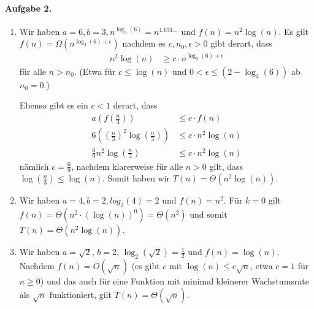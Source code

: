 \documentclass{article}
\begin{document}
\paragraph{Aufgabe 2.}

\begin{enumerate}
    \item Wir haben $a = 6, b = 3, n^{\log_{3}(6)} = n^{1.631\ldots}$ und $f(n) = n^2 \log(n)$. Es gilt $f(n) = \Omega(n^{\log_{3}(6) + \epsilon})$ nachdem es $c, n_0, \epsilon > 0$ gibt derart, dass
    \begin{align*}
        n^2 \log(n) &\geq c \cdot n^{\log_{3}(6) + \epsilon}
    \end{align*}
    für alle $n > n_0$. (Etwa f\"ur $c \leq \log(n)$ und $0 < \epsilon \leq (2 - \log_{3}(6))$ ab $n_0 = 0$.)
 
    Ebenso gibt es ein $c < 1$ derart, dass
    \begin{align*}
        a\left(f\left(\frac{n}{3}\right)\right) &\leq c \cdot f(n) \\
        6\left(\left(\frac{n}{3}\right)^2 \log(\frac{n}{3})\right) &\leq c \cdot n^2 \log(n) \\
        \frac{6}{9}n^2 \log(\frac{n}{3}) &\leq c \cdot n^2 \log(n)
    \end{align*}
    nämlich $c = \frac{6}{9}$, nachdem klarerweise für alle $n > 0$ gilt, dass $\log(\frac{n}{3}) \leq \log(n)$. Somit haben wir $T(n) = \Theta(n^2 \log(n))$.

    \item Wir haben $a = 4, b = 2, log_2(4) = 2$ und $f(n) = n^2$. F\"ur $k = 0$ gilt $f(n) = \Theta(n^2 \cdot (\log(n))^0) = \Theta(n^2)$ und somit $T(n) = \Theta(n^2 \log(n))$.
    
    \item Wir haben $a = \sqrt{2}$, $b = 2$, $\log_2(\sqrt{2}) = \frac{1}{2}$ und $f(n) = \log(n)$. Nachdem $f(n) = O(\sqrt{n})$ (es gibt $c$ mit $\log(n) \leq c\sqrt{n}$, etwa $c = 1$ f\"ur $n \geq 0$) und das auch f\"ur eine Funktion mit minimal kleinerer Wachstumsrate als $\sqrt{n}$ funktioniert, gilt $T(n) = \Theta(\sqrt{n})$.
\end{enumerate}
\end{document}
